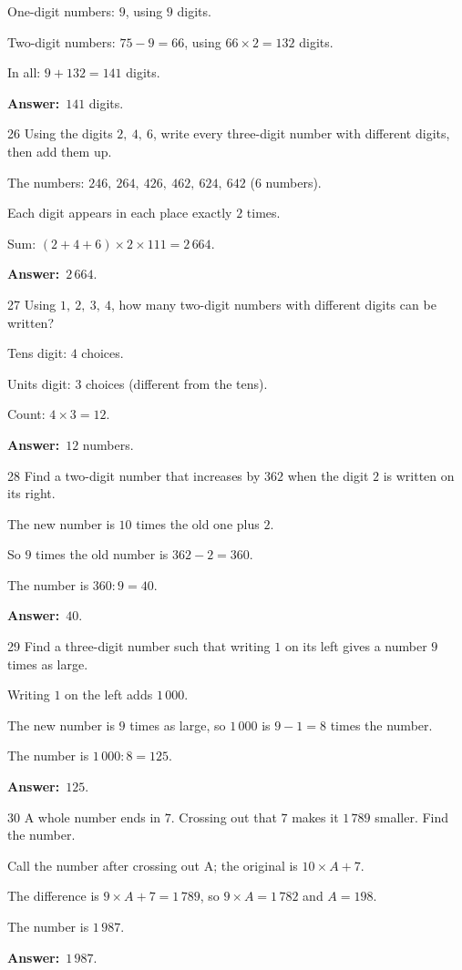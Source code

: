 \documentclass[11pt]{article}
\newif\ifsol \solfalse
\providecommand{\AnsWord}{Đáp số}
\newcommand{\dapso}[1]{\par\textbf{\AnsWord:}\ #1}
\newcommand{\probsol}[1]{%
  \begin{lrbox}{\solmeasure}\begin{minipage}{\dimexpr\linewidth-24pt\relax}#1\end{minipage}\end{lrbox}%
  \ifsol
    \begin{solbox}#1\end{solbox}%
  \else
    \setlength{\solht}{\dimexpr\ht\solmeasure+\dp\solmeasure+0.85cm\relax}%
    \ifdim\solht<1.35cm\setlength{\solht}{1.35cm}\fi
    \begin{tcolorbox}[colback=white,colframe=Line,boxrule=0.8pt,arc=5pt,
      left=8pt,right=8pt,top=4pt,bottom=4pt,height=\solht]{\footnotesize\color{Slate}\itshape\WorkWord}\end{tcolorbox}%
  \fi}
\newcommand{\gap}{\vspace{0.3cm}}
\def\WorkWord{Your work:}
\def\AnsWord{Answer}
\begin{document}
\probsol{
One-digit numbers: $9$, using $9$ digits.\par Two-digit numbers: $75-9=66$, using $66\times2=132$ digits.\par In all: $9+132=141$ digits.
\dapso{$141$ digits.}}
\gap
\begin{probbox}{26}{\relax}
Using the digits $2,\ 4,\ 6$, write every three-digit number with different digits, then add them up.
\end{probbox}
\probsol{
The numbers: $246,\ 264,\ 426,\ 462,\ 624,\ 642$ ($6$ numbers).\par Each digit appears in each place exactly $2$ times.\par Sum: $(2+4+6)\times2\times111=2\,664$.
\dapso{$2\,664$.}}
\gap
\begin{probbox}{27}{\relax}
Using $1,\ 2,\ 3,\ 4$, how many two-digit numbers with different digits can be written?
\end{probbox}
\probsol{
Tens digit: $4$ choices.\par Units digit: $3$ choices (different from the tens).\par Count: $4\times3=12$.
\dapso{$12$ numbers.}}
\gap
\begin{probbox}{28}{\relax}
Find a two-digit number that increases by $362$ when the digit $2$ is written on its right.
\end{probbox}
\probsol{
The new number is $10$ times the old one plus $2$.\par So $9$ times the old number is $362-2=360$.\par The number is $360:9=40$.
\dapso{$40$.}}
\gap
\begin{probbox}{29}{\relax}
Find a three-digit number such that writing $1$ on its left gives a number $9$ times as large.
\end{probbox}
\probsol{
Writing $1$ on the left adds $1\,000$.\par The new number is $9$ times as large, so $1\,000$ is $9-1=8$ times the number.\par The number is $1\,000:8=125$.
\dapso{$125$.}}
\gap
\begin{probbox}{30}{\relax}
A whole number ends in $7$. Crossing out that $7$ makes it $1\,789$ smaller. Find the number.
\end{probbox}
\probsol{
Call the number after crossing out A; the original is $10\times A+7$.\par The difference is $9\times A+7=1\,789$, so $9\times A=1\,782$ and $A=198$.\par The number is $1\,987$.
\dapso{$1\,987$.}}
\end{document}
